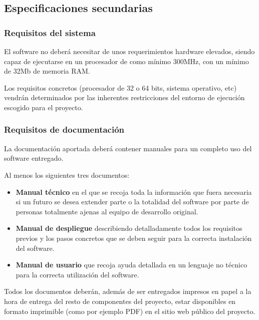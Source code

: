 
\subsection{Especificaciones secundarias}

\subsubsection{Requisitos del sistema} 

El software no deberá necesitar de unos requerimientos hardware elevados, 
siendo capaz de ejecutarse en un procesador de como mínimo 300MHz, con 
un mínimo de 32Mb de memoria RAM. 

Los requisitos concretos (procesador de 32 o 64 bits, sistema operativo, 
etc) vendrán determinados por las inherentes restricciones del entorno de 
ejecución escogido para el proyecto.

\subsubsection{Requisitos de documentación} 

La documentación aportada deberá contener manuales para un completo uso 
del software entregado.

Al menos los siguientes tres documentos:

\begin{itemize}
  \item \textbf{Manual técnico} en el que se recoja toda la información que 
	fuera necesaria si un futuro se desea extender parte o la totalidad 
	del software por parte de personas totalmente ajenas al equipo de 
	desarrollo original.
  \item \textbf{Manual de despliegue} describiendo detalladamente todos los 
	requisitos previos y los pasos concretos que se deben seguir para la 
	correcta instalación del software.
  \item \textbf{Manual de usuario} que recoja ayuda detallada en un lenguaje
	no técnico para la correcta utilización del software.
\end{itemize}

Todos los documentos deberán, además de ser entregados impresos en papel a la
hora de entrega del resto de componentes del proyecto, estar disponibles en
formato imprimible (como por ejemplo PDF) en el sitio web público del proyecto.
